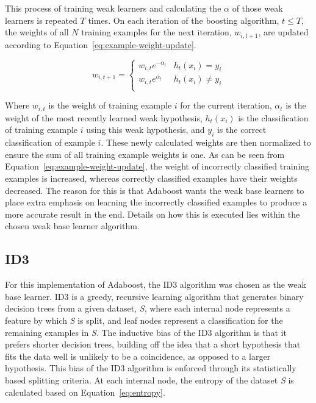 \documentclass[a4paper]{article}
\begin{document}
This process of training weak learners and calculating the $\alpha$ of those weak learners is repeated $T$ times. On each iteration of the boosting algorithm, $t \le T$, the weights of all $N$ training examples for the next iteration, $w_{i, t+1}$, are updated according to Equation~\ref{eq:example-weight-update}.

\begin{equation}
    \label{eq:example-weight-update}
    w_{i, t+1} =
    \begin{cases} 
      w_{i,t}e^{-\alpha_t} & h_t(x_i) = y_i \\
      w_{i,t}e^{\alpha_t} & h_t(x_i) \ne y_i \\
   \end{cases}
\end{equation}

Where $w_{i,t}$ is the weight of training example $i$ for the current iteration, $\alpha_t$ is the weight of the most recently learned weak hypothesis, $h_t(x_i)$ is the classification of training example $i$ using this weak hypothesis, and $y_i$ is the correct classification of example $i$. These newly calculated weights are then normalized to ensure the sum of all training example weights is one. As can be seen from Equation~\ref{eq:example-weight-update}, the weight of incorrectly classified training examples is increased, whereas correctly classified examples have their weights decreased. The reason for this is that Adaboost wants the weak base learners to place extra emphasis on learning the incorrectly classified examples to produce a more accurate result in the end. Details on how this is executed lies within the chosen weak base learner algorithm. 

\subsection{ID3}
For this implementation of Adaboost, the ID3 algorithm was chosen as the weak base learner. ID3 is a greedy, recursive learning algorithm that generates binary decision trees from a given dataset, \textit{S}, where each internal node represents a feature by which \textit{S} is split, and leaf nodes represent a classification for the remaining examples in \textit{S}. The inductive bias of the ID3 algorithm is that it prefers shorter decision trees, building off the idea that a short hypothesis that fits the data well is unlikely to be a coincidence, as opposed to a larger hypothesis. This bias of the ID3 algorithm is enforced through its statistically based splitting criteria. At each internal node, the entropy of the dataset \textit{S} is calculated based on Equation~\ref{eq:entropy}.
\end{document}
